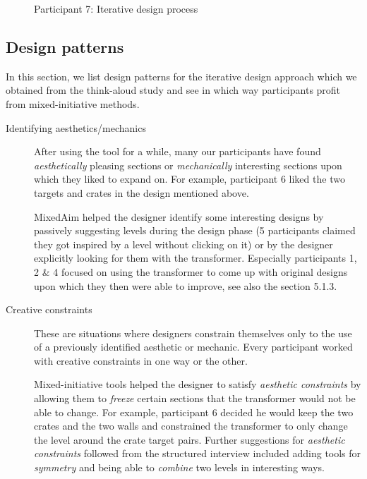 \begin{figure}[!htbp]
\caption{Participant 7: Iterative design process}
\end{figure}

\subsection{Design patterns}

In this section, we list design patterns for the iterative design approach which we obtained from the think-aloud study and see in which way participants profit from mixed-initiative methods.

\newpage
\begin{description}
\item[Identifying aesthetics/mechanics] After using the tool for a while, many our participants have found \textit{aesthetically} pleasing sections or \textit{mechanically} interesting sections upon which they liked to expand on. For example, participant 6 liked the two targets and crates in the design mentioned above.



MixedAim helped the designer identify some interesting designs by passively suggesting levels during the design phase (5 participants claimed they got inspired by a level without clicking on it) or by the designer explicitly looking for them with the transformer. Especially participants 1, 2 \& 4 focused on using the transformer to come up with original designs upon which they then were able to improve, see also the section 5.1.3. 

\item[Creative constraints] These are situations where designers constrain themselves only to the use of a previously identified aesthetic or mechanic. Every participant worked with creative constraints in one way or the other.

Mixed-initiative tools helped the designer to satisfy \textit{aesthetic constraints} by allowing them to \textit{freeze} certain sections that the transformer would not be able to change. For example, participant 6 decided he would keep the two crates and the two walls and constrained the transformer to only change the level around the crate target pairs. Further suggestions for \textit{aesthetic constraints} followed from the structured interview included adding tools for \textit{symmetry} and being able to \textit{combine} two levels in interesting ways.


\end{description}
